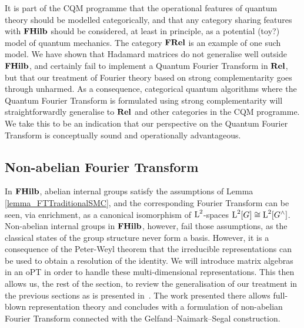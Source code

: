 It is part of the CQM programme that the operational features of quantum theory should be modelled categorically, and that any category sharing features with $\mathbf{FHilb}$ should be considered, at least in principle, as a potential (toy?) model of quantum mechanics. The category $\mathbf{FRel}$ is an example of one such model. We have shown that Hadamard matrices do not generalise well outside $\mathbf{FHilb}$, and certainly fail to implement a Quantum Fourier Transform in $\mathbf{Rel}$, but that our treatment of Fourier theory based on strong complementarity goes through unharmed. As a consequence, categorical quantum algorithms where the Quantum Fourier Transform is formulated using strong complementarity will straightforwardly generalise to $\mathbf{Rel}$ and other categories in the CQM programme. We take this to be an indication that our perspective on the Quantum Fourier Transform is conceptually sound and operationally advantageous.

\subsection{Non-abelian Fourier Transform}
\label{section_NonAbelianFourierTransform}

In $\mathbf{FHilb}$, abelian internal groups satisfy the assumptions of Lemma \ref{lemma_FTTraditionalSMC}, and the corresponding Fourier Transform can be seen, via enrichment, as a canonical isomorphism of $\operatorname{L}^2$-spaces $\operatorname{L}^2[G] \cong \operatorname{L}^2[G^\wedge]$. Non-abelian internal groups in $\mathbf{FHilb}$, however, fail those assumptions, as the classical states of the group structure never form a basis. However, it is a consequence of the Peter-Weyl theorem that the irreducible representations can be used to obtain a resolution of the identity. We will introduce matrix algebras in an oPT in order to handle these multi-dimensional representations. This then allows us, the rest of the section, to review the generalisation of our treatment in the previous sections as is presented in~\cite{gogioso2015fourier}. The work presented there allows full-blown representation theory and concludes with a formulation of non-abelian Fourier Transform connected with the Gelfand--Naimark--Segal construction.

